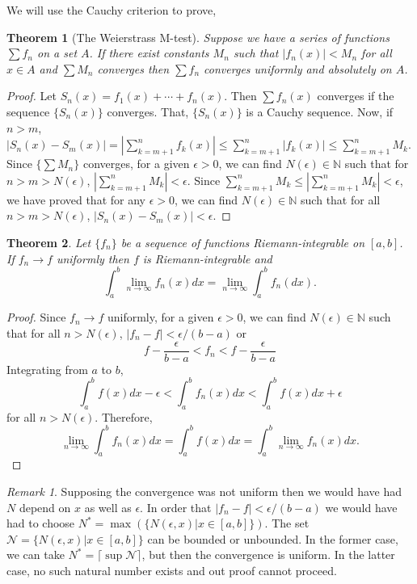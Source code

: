 \documentclass{article}
\theoremstyle{plain}
\newtheorem{thm}{Theorem}
\numberwithin{thm}{section}
\theoremstyle{plain}
\numberwithin{prop}{section}
\theoremstyle{definition}
\numberwithin{defn}{section}
\theoremstyle{remark}
\newtheorem*{rem}{Remark}
\numberwithin{equation}{section}
\begin{document}
We will use the Cauchy criterion to prove,
\begin{thm}[The Weierstrass M-test]\label{s5t2}
Suppose we have a series of functions $\sum f_n$ on a set $A$. If there exist
constants $M_n$ such that $|f_n(x)| < M_n$ for all $x \in A$ and $\sum M_n$
converges then $\sum f_n$ converges uniformly and absolutely on $A$.
\end{thm}
\begin{proof}
Let $S_n(x) = f_1(x) + \cdots + f_n(x)$. Then $\sum f_n(x)$ converges if the
sequence $\{S_n(x)\}$ converges. That, $\{S_n(x)\}$ is a Cauchy sequence. Now,
if $n > m$, $|S_n(x) - S_m(x)| = |\sum_{k=m+1}^n f_k(x)| \le \sum_{k=m+1}^n
|f_k(x)| \le \sum_{k=m+1}^n M_k$. Since $\{\sum M_n\}$ converges, for a given
$\epsilon > 0$, we can find $N(\epsilon) \in \mathbb{N}$ such that for $n > m
> N(\epsilon)$, $|\sum_{k={m+1}}^n M_k| < \epsilon$. Since $\sum_{k=m+1}^n M_k 
\le |\sum_{k={m+1}}^n M_k| < \epsilon$, we have proved that for any $\epsilon 
> 0$, we can find $N(\epsilon) \in \mathbb{N}$ such that for all $n > m > 
N(\epsilon)$, $|S_n(x) - S_m(x)| < \epsilon$.
\end{proof}

\begin{thm}\label{s5t3}
Let $\{f_n\}$ be a sequence of functions Riemann-integrable on $[a, b]$. If
$f_n \rightarrow f$ uniformly then $f$ is Riemann-integrable and
\[
\int_a^b\lim_{n \rightarrow \infty} f_n(x)dx = 
\lim_{n \rightarrow \infty}\int_a^b f_n(dx).
\]
\end{thm}
\begin{proof}
Since $f_n \rightarrow f$ uniformly, for a given $\epsilon > 0$, we can find 
$N(\epsilon) \in \mathbb{N}$ such that for all $n > N(\epsilon)$, $|f_n - f| < 
\epsilon/(b - a)$ or 
\[
f - \frac{\epsilon}{b - a} < f_n < f - \frac{\epsilon}{b - a}
\]
Integrating from $a$ to $b$,
\[
\int_a^b f(x)dx - \epsilon < \int_a^b f_n(x)dx < \int_a^b f(x)dx + \epsilon
\]
for all $n > N(\epsilon)$. Therefore,
\[
\lim_{n \rightarrow \infty}\int_a^b f_n(x)dx = \int_a^b f(x)dx = 
\int_a^b \lim_{n \rightarrow \infty}f_n(x)dx.
\]
\end{proof}

\begin{rem}
Supposing the convergence was not uniform then we would have had $N$ depend on
$x$ as well as $\epsilon$. In order that $|f_n - f| < \epsilon/(b - a)$ we 
would have had to choose $N^\ast = \max(\{N(\epsilon, x) | x \in [a, b]\})$. 
The set $\mathcal{N} = \{N(\epsilon, x) | x \in [a, b]\}$ can be bounded or 
unbounded. In the former case, we can take $N^\ast=\lceil\sup\mathcal{N}\rceil$,
but then the convergence is uniform. In the latter case, no such natural number
exists and out proof cannot proceed.
\end{rem}
\end{document}
